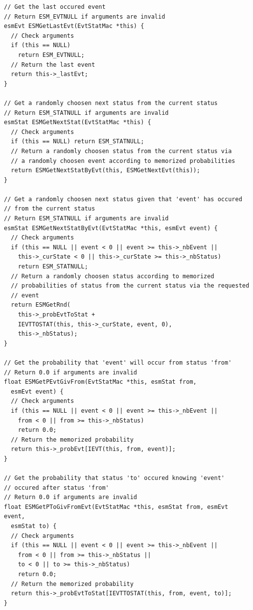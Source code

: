\documentclass[12pt, a4paper]{article}
\begin{document}
\begin{scriptsize}
\begin{ttfamily}
\begin{lstlisting}
// Get the last occured event 
// Return ESM_EVTNULL if arguments are invalid
esmEvt ESMGetLastEvt(EvtStatMac *this) {
  // Check arguments
  if (this == NULL) 
    return ESM_EVTNULL;
  // Return the last event
  return this->_lastEvt;
}

// Get a randomly choosen next status from the current status
// Return ESM_STATNULL if arguments are invalid
esmStat ESMGetNextStat(EvtStatMac *this) {
  // Check arguments
  if (this == NULL) return ESM_STATNULL;
  // Return a randomly choosen status from the current status via 
  // a randomly choosen event according to memorized probabilities
  return ESMGetNextStatByEvt(this, ESMGetNextEvt(this));
}

// Get a randomly choosen next status given that 'event' has occured 
// from the current status
// Return ESM_STATNULL if arguments are invalid
esmStat ESMGetNextStatByEvt(EvtStatMac *this, esmEvt event) {
  // Check arguments
  if (this == NULL || event < 0 || event >= this->_nbEvent ||
    this->_curState < 0 || this->_curState >= this->_nbStatus) 
    return ESM_STATNULL;
  // Return a randomly choosen status according to memorized 
  // probabilities of status from the current status via the requested
  // event
  return ESMGetRnd( 
    this->_probEvtToStat + 
    IEVTTOSTAT(this, this->_curState, event, 0), 
    this->_nbStatus);
}

// Get the probability that 'event' will occur from status 'from'
// Return 0.0 if arguments are invalid
float ESMGetPEvtGivFrom(EvtStatMac *this, esmStat from, 
  esmEvt event) {
  // Check arguments
  if (this == NULL || event < 0 || event >= this->_nbEvent ||
    from < 0 || from >= this->_nbStatus) 
    return 0.0;
  // Return the memorized probability
  return this->_probEvt[IEVT(this, from, event)];
}

// Get the probability that status 'to' occured knowing 'event'
// occured after status 'from'
// Return 0.0 if arguments are invalid
float ESMGetPToGivFromEvt(EvtStatMac *this, esmStat from, esmEvt event, 
  esmStat to) {
  // Check arguments
  if (this == NULL || event < 0 || event >= this->_nbEvent ||
    from < 0 || from >= this->_nbStatus ||
    to < 0 || to >= this->_nbStatus) 
    return 0.0;
  // Return the memorized probability
  return this->_probEvtToStat[IEVTTOSTAT(this, from, event, to)];  
}


\end{lstlisting}
\end{ttfamily}
\end{scriptsize}
\end{document}
